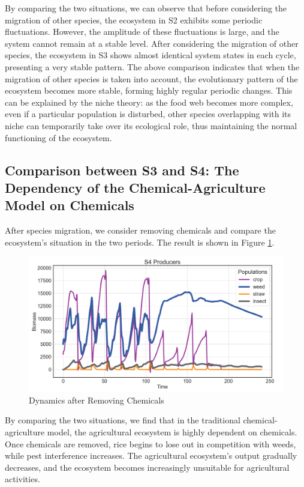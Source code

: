 \documentclass{HZNUMCM}
\begin{document}
        By comparing the two situations, we can observe that before considering the migration of other species, 
        the ecosystem in S2 exhibits some periodic fluctuations. However, the amplitude of these fluctuations is large, 
        and the system cannot remain at a stable level. After considering the migration of other species, 
        the ecosystem in S3 shows almost identical system states in each cycle, presenting a very stable pattern. 
        The above comparison indicates that when the migration of other species is taken into account, 
        the evolutionary pattern of the ecosystem becomes more stable, forming highly regular periodic changes. 
        This can be explained by the niche theory: as the food web becomes more complex, 
        even if a particular population is disturbed, 
        other species overlapping with its niche can temporarily take over its ecological role, 
        thus maintaining the normal functioning of the ecosystem.

      \subsection{Comparison between S3 and S4: The Dependency of the Chemical-Agriculture Model on Chemicals}
      After species migration, we consider removing chemicals and compare the ecosystem's situation in the two periods. 
      The result is shown in Figure \ref{fig:S4}.
      \begin{figure}
        \centering
        \includegraphics[width=0.7\linewidth]{images/P4_producers.png}
        \caption{Dynamics after Removing Chemicals}
        \label{fig:S4}
      \end{figure}
      
      By comparing the two situations, we find that in the traditional chemical-agriculture model, 
      the agricultural ecosystem is highly dependent on chemicals. Once chemicals are removed, 
      rice begins to lose out in competition with weeds, while pest interference increases. 
      The agricultural ecosystem's output gradually decreases, 
      and the ecosystem becomes increasingly unsuitable for agricultural activities.
      
\end{document}

